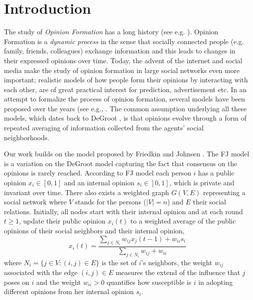 \section{Introduction}

The study of \emph{Opinion Formation} has a long history (see e.g.
\cite{Jackson}). Opinion Formation is a \emph{dynamic process} in the sense
that socially connected people (e.g. family, friends, colleagues) exchange
information and this leads to changes in their expressed opinions over time.
Today, the advent of the internet and social media make the study of opinion
formation in large social networks even more important; realistic models of how
people form their opinions by interacting with each other, are of great
practical interest for prediction, advertisement etc. In an attempt to
formalize the process of opinion formation, several models have been proposed
over the years (see e.g., \cite{DeGroot,FJ90,HK}.  The common assumption
underlying all these models, which dates back to DeGroot \cite{DeGroot}, is
that opinions evolve through a form of repeated averaging of information
collected from the agents' social neighborhoods.

Our work builds on the model proposed by Friedkin and Johnsen \cite{FJ90}.  The
FJ model is a variation on the DeGroot model capturing the fact that consensus
on the opinions is rarely reached.  According to FJ model each person $i$ has a
public opinion $x_i \in [0,1]$ and an internal opinion $s_i\in [0,1]$, which is
private and invariant over time. There also exists a weighted graph $G(V,E)$
representing a social network where $V$ stands for the persons ($|V|=n$) and
$E$ their social relations. Initially, all nodes start with their internal
opinion and at each round $t\geq1$, update their public opinion $x_i(t)$ to a
weighted average of the public opinions of their social neighbors and their
internal opinion,
%
\begin{equation}\label{eq:FJ_model}
  x_i(t)= \frac{\sum_{j\in N_i}w_{ij}x_j(t-1) + w_{ii}s_i}{\sum_{j\in
      N_i}w_{ij}+w_{ii}}
\end{equation}
%
where $N_i =\{j \in V:(i,j) \in E\}$ is the set of $i$'s neighbors, the weight
$w_{ij}$ associated with the edge $(i,j) \in E$ measures the extend of the
influence that $j$ poses on $i$ and the weight $w_{ii}>0$ quantifies how
susceptible is $i$ in adopting different opinions from her internal opinion
$s_i$.


